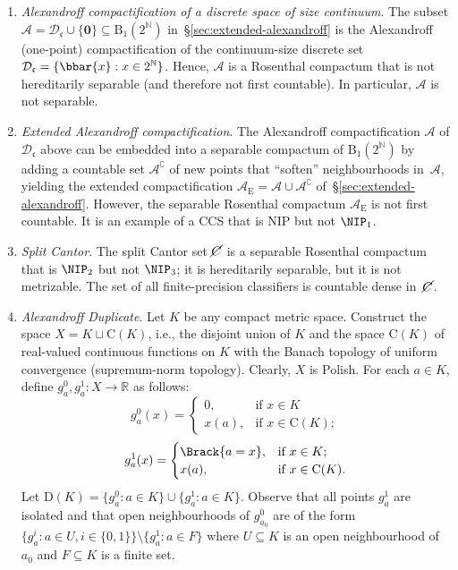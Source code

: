 \begin{example}\label{exa:Rosenthal-compacta}
\hfill
\begin{enumerate}
    \item \emph{Alexandroff compactification of a discrete space of size continuum}.
    The subset $\mathcal{A} = \mathcal{D}_{\mathfrak{c}}\cup\{\mathbf{0}\} \subseteq \mathrm{B}_1(2^{\mathbb{N}})$ in~§\ref{sec:extended-alexandroff} is the Alexandroff (one-point) compactification of the continuum-size discrete set~$\mathcal{D}_{\mathfrak{c}} = \{\bbar{x}: x\in 2^{\mathbb{N}}\}$.
    Hence, $\mathcal{A}$ is a Rosenthal compactum that is not hereditarily separable (and therefore not first countable).
    In particular, $\mathcal{A}$ is not separable.

    \item \emph{Extended Alexandroff compactification}.
    The Alexandroff compactification $\mathcal{A}$ of $\mathcal{D}_{\mathfrak{c}}$ above can be embedded into a separable compactum of $\mathrm{B}_1(2^{\mathbb{N}})$ by adding a countable set $\mathcal{A}^{\complement}$ of new points that “soften” neighbourhoods in~$\mathcal{A}$, yielding the extended compactification $\mathcal{A}_{\mathrm{E}} = \mathcal{A}\cup \mathcal{A}^{\complement}$ of~§\ref{sec:extended-alexandroff}.
    However, the separable Rosenthal compactum $\mathcal{A}_{\mathrm{E}}$ is not first countable.
    It is an example of a CCS that is NIP but not $\NIP_1$.

    \item \emph{Split Cantor}.
    The split Cantor set $\cancel{C}$ is a separable Rosenthal compactum that is $\NIP_2$ but not $\NIP_3$; it is hereditarily separable, but it is not metrizable.
    The set of all finite-precision classifiers is countable dense in~$\cancel{C}$.

    \item \emph{Alexandroff Duplicate}.
    Let $K$ be any compact metric space.
    Construct the space $X = K\sqcup \mathrm{C}(K)$, i.e., the disjoint union of $K$ and the space $\mathrm{C}(K)$ of real-valued continuous functions on $K$ with the Banach topology of uniform convergence (supremum-norm topology).
    Clearly, $X$ is Polish.
    For each $a\in K$, define $g_a^0,g_a^1\colon X\to\mathbb{R}$ as follows:
    \[
    g_a^0(x)=\begin{cases}
        0, & \text{if }x\in K\\
        x(a), & \text{if }x\in \mathrm{C}(K);
    \end{cases}
    \]
    \[
	g_a^1(x)=\begin{cases}
        \Brack{a = x}, & \text{if }x\in K;\\
        x(a), & \text{if }x\in \mathrm{C}(K).
    \end{cases}
    \]
    Let $\mathrm{D}(K)=\{g_a^0:a\in K\}\cup\{g_a^1:a\in K\}$.
Observe that all points $g_a^1$ are isolated and that open neighbourhoods of $g_{a_0}^0$ are of the form $\{g_a^i:a\in U,i\in\{0,1\}\}\setminus\{g_a^1:a\in F\}$ where $U\subseteq K$ is an open neighbourhood of $a_0$ and $F\subseteq K$ is a finite set.


\end{enumerate}
\end{example}
